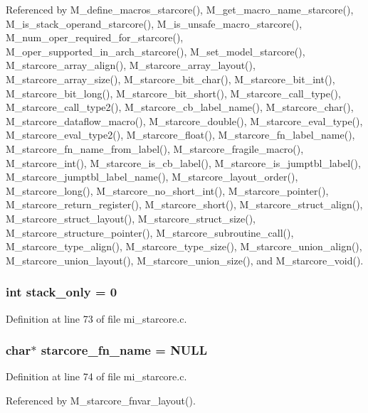Referenced by M\_\-define\_\-macros\_\-starcore(), M\_\-get\_\-macro\_\-name\_\-starcore(), M\_\-is\_\-stack\_\-operand\_\-starcore(), M\_\-is\_\-unsafe\_\-macro\_\-starcore(), M\_\-num\_\-oper\_\-required\_\-for\_\-starcore(), M\_\-oper\_\-supported\_\-in\_\-arch\_\-starcore(), M\_\-set\_\-model\_\-starcore(), M\_\-starcore\_\-array\_\-align(), M\_\-starcore\_\-array\_\-layout(), M\_\-starcore\_\-array\_\-size(), M\_\-starcore\_\-bit\_\-char(), M\_\-starcore\_\-bit\_\-int(), M\_\-starcore\_\-bit\_\-long(), M\_\-starcore\_\-bit\_\-short(), M\_\-starcore\_\-call\_\-type(), M\_\-starcore\_\-call\_\-type2(), M\_\-starcore\_\-cb\_\-label\_\-name(), M\_\-starcore\_\-char(), M\_\-starcore\_\-dataflow\_\-macro(), M\_\-starcore\_\-double(), M\_\-starcore\_\-eval\_\-type(), M\_\-starcore\_\-eval\_\-type2(), M\_\-starcore\_\-float(), M\_\-starcore\_\-fn\_\-label\_\-name(), M\_\-starcore\_\-fn\_\-name\_\-from\_\-label(), M\_\-starcore\_\-fragile\_\-macro(), M\_\-starcore\_\-int(), M\_\-starcore\_\-is\_\-cb\_\-label(), M\_\-starcore\_\-is\_\-jumptbl\_\-label(), M\_\-starcore\_\-jumptbl\_\-label\_\-name(), M\_\-starcore\_\-layout\_\-order(), M\_\-starcore\_\-long(), M\_\-starcore\_\-no\_\-short\_\-int(), M\_\-starcore\_\-pointer(), M\_\-starcore\_\-return\_\-register(), M\_\-starcore\_\-short(), M\_\-starcore\_\-struct\_\-align(), M\_\-starcore\_\-struct\_\-layout(), M\_\-starcore\_\-struct\_\-size(), M\_\-starcore\_\-structure\_\-pointer(), M\_\-starcore\_\-subroutine\_\-call(), M\_\-starcore\_\-type\_\-align(), M\_\-starcore\_\-type\_\-size(), M\_\-starcore\_\-union\_\-align(), M\_\-starcore\_\-union\_\-layout(), M\_\-starcore\_\-union\_\-size(), and M\_\-starcore\_\-void().
\subsubsection{\setlength{\rightskip}{0pt plus 5cm}int \bf{stack\_\-only} = 0}\label{mi__starcore_8c_d4a1797247e81907d2e322cf7bdd4ea0}




Definition at line 73 of file mi\_\-starcore.c.
\subsubsection{\setlength{\rightskip}{0pt plus 5cm}char$\ast$ \bf{starcore\_\-fn\_\-name} = \bf{NULL}}\label{mi__starcore_8c_1f1e34208502eae494e2ba85bcdb0e9f}




Definition at line 74 of file mi\_\-starcore.c.

Referenced by M\_\-starcore\_\-fnvar\_\-layout().